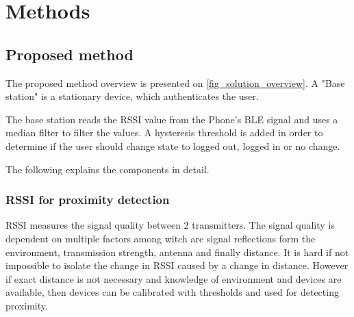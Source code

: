 \section{Methods}


\subsection{Proposed method}

The proposed method overview is presented on \cref{fig_solution_overview}. A "Base station" is a stationary device, which authenticates the user.

The base station reads the RSSI value from the Phone's BLE signal and uses a median filter to filter the values. A hysteresis threshold is added in order to determine if the user should change state to logged out, logged in or no change.

The following explains the components in detail.

\subsubsection{RSSI for proximity detection}

RSSI measures the signal quality between 2 transmitters.
The signal quality is dependent on multiple factors among witch are signal reflections form the environment, transmission strength, antenna and finally distance\cite{ref:rssidistance}. 
It is hard if not impossible to isolate the change in RSSI caused by a change in distance\cite{ref:bandara}.
However if exact distance is not necessary and knowledge of environment and devices are available, then devices can be calibrated with thresholds and used for detecting proximity.


